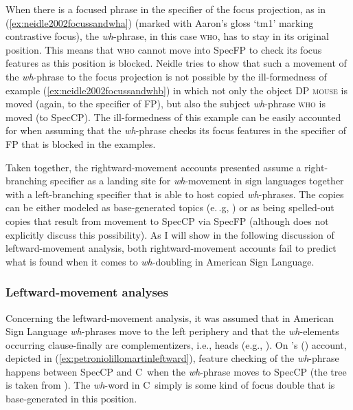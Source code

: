 \noindent When there is a focused phrase in the specifier of the focus projection, as in (\ref{ex:neidle2002focussandwha}) (marked with Aaron's gloss `tm1' marking contrastive focus), the \textit{wh}-phrase, in this case \textsc{who}, has to stay in its original position. This means that \textsc{who} cannot move into SpecFP to check its focus features as this position is blocked. Neidle tries to show that such a movement of the \textit{wh}-phrase to the focus projection is not possible by the ill-formedness of example (\ref{ex:neidle2002focussandwhb}) in which not only the object DP \textsc{mouse} is moved (again, to the specifier of FP), but also the subject \textit{wh}-phrase \textsc{who} is moved (to SpecCP). The ill-formedness of this example can be easily accounted for when assuming that the \textit{wh}-phrase checks its focus features in the specifier of FP that is blocked in the examples.

Taken together, the rightward-movement accounts presented assume a right-branching specifier as a landing site for \textit{wh}-movement in sign languages together with a left-branching specifier that is able to host copied \textit{wh}-phrases. The copies can be either modeled as base-generated topics (e.\,.g, \citealt{neidle1994architecture}) or as being spelled-out copies that result from movement to SpecCP via SpecFP \citep{neidle2002language} (although \citealt{neidle2002language} does not explicitly discuss this possibility). As I will show in the following discussion of leftward-movement analysis, both rightward-movement accounts fail to predict what is found when it comes to \textit{wh}-doubling in American Sign Language.

\subsubsection{Leftward-movement analyses}
\noindent Concerning the leftward-movement analysis, it was assumed that in American Sign Language \textit{wh}-phrases move to the left periphery and that the \textit{wh}-elements occurring clause-finally are complementizers, i.e., heads (e.g., \citealt{petronio1997}). On \citeauthor{petronio1997}'s (\citeyear{petronio1997}) account, depicted in (\ref{ex:petroniolillomartinleftward}), feature checking of the \textit{wh}-phrase happens between SpecCP and C\textdegree\ when the \textit{wh}-phrase moves to SpecCP (the tree is taken from \citealt[27]{petronio1997}). The \textit{wh}-word in C\textdegree\ simply is some kind of focus double that is base-generated in this position.



